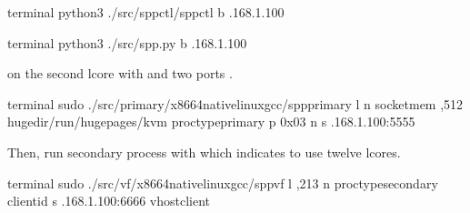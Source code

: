 \documentclass[a4paper,11pt,openany,oneside,english]{sphinxmanual}
\begin{document}
\begin{sphinxVerbatim}[commandchars=\\\{\},formatcom=\footnotesize]
 terminal 
 python3 ./src/spp\PYGZhy{}ctl/spp\PYGZhy{}ctl \PYGZhy{}b .168.1.100
\end{sphinxVerbatim}

\begin{sphinxVerbatim}[commandchars=\\\{\},formatcom=\footnotesize]
 terminal 
 python3 ./src/spp.py \PYGZhy{}b .168.1.100
\end{sphinxVerbatim}

 on the second lcore with  and two ports .

\begin{sphinxVerbatim}[commandchars=\\\{\},formatcom=\footnotesize]
 terminal 
 sudo ./src/primary/x86\PYGZus{}64\PYGZhy{}native\PYGZhy{}linux\PYGZhy{}gcc/spp\PYGZus{}primary 
    \PYGZhy{}l  \PYGZhy{}n  
    \PYGZhy{}\PYGZhy{}socket\PYGZhy{}mem ,512 
    \PYGZhy{}\PYGZhy{}huge\PYGZhy{}dir/run/hugepages/kvm 
    \PYGZhy{}\PYGZhy{}proc\PYGZhy{}typeprimary 
    \PYGZhy{}\PYGZhy{} 
    \PYGZhy{}p 0x03 \PYGZhy{}n  \PYGZhy{}s .168.1.100:5555
\end{sphinxVerbatim}

Then, run secondary process  with  which indicates
to use twelve lcores.

\begin{sphinxVerbatim}[commandchars=\\\{\},formatcom=\footnotesize]
 terminal 
 sudo ./src/vf/x86\PYGZus{}64\PYGZhy{}native\PYGZhy{}linux\PYGZhy{}gcc/spp\PYGZus{}vf 
    \PYGZhy{}l ,2\PYGZhy{}13 
    \PYGZhy{}n  \PYGZhy{}\PYGZhy{}proc\PYGZhy{}typesecondary 
    \PYGZhy{}\PYGZhy{} 
    \PYGZhy{}\PYGZhy{}client\PYGZhy{}id  
    \PYGZhy{}s .168.1.100:6666 \PYGZhy{}\PYGZhy{}vhost\PYGZhy{}client
\end{sphinxVerbatim}
\end{document}
